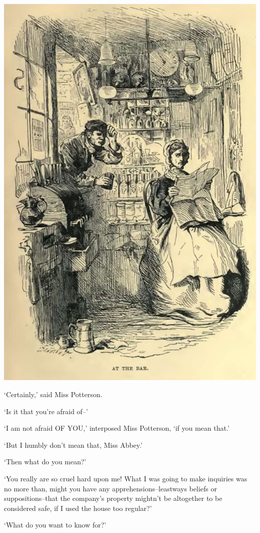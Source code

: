 \includegraphics[scale=2.3]{01-06-01}

‘Certainly,’ said Miss Potterson.

‘Is it that you’re afraid of--’

‘I am not afraid OF YOU,’ interposed Miss Potterson, ‘if you mean that.’

‘But I humbly don’t mean that, Miss Abbey.’

‘Then what do you mean?’

‘You really are so cruel hard upon me! What I was going to make
inquiries was no more than, might you have any apprehensions--leastways
beliefs or suppositions--that the company’s property mightn’t be
altogether to be considered safe, if I used the house too regular?’

‘What do you want to know for?’

